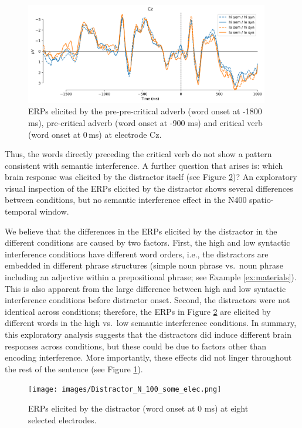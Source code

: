 \documentclass[a4paper, man, floatsintext]{apa7}
\begin{document}
\begin{figure}[H]
    \caption{ERPs elicited by the pre-pre-critical adverb (word onset at -1800 ms), pre-critical adverb (word onset at -900 ms) and critical verb (word onset at 0\,ms) at electrode Cz.}
    \label{fig:erp_precrit}
    \centering
    \includegraphics[width=0.95\textwidth]{images/N_103_Cz_precrit.png}
\end{figure}

Thus, the words directly preceding the critical verb do not show a pattern consistent with semantic interference. A further question that arises is: which brain response was elicited by the distractor itself (see Figure \ref{fig:erp_distractor})? An exploratory visual inspection of the ERPs elicited by the distractor shows several differences between conditions, but no semantic interference effect in the N400 spatio-temporal window. 

We believe that the differences in the ERPs elicited by the distractor in the different conditions are caused by two factors. First, the high and low syntactic interference conditions have different word orders, i.e., the distractors are embedded in different phrase structures (simple noun phrase vs.\ noun phrase including an adjective within a prepositional phrase; see Example \ref{ex:materials}). This is also apparent from the large difference between high and low syntactic interference conditions before distractor onset. Second, the distractors were not identical across conditions; therefore, the ERPs in Figure \ref{fig:erp_distractor} are elicited by different words in the high vs.\ low semantic interference conditions. In summary, this exploratory analysis suggests that the distractors did induce different brain responses across conditions, but these could be due to factors other than encoding interference. More importantly, these effects did not linger throughout the rest of the sentence (see Figure \ref{fig:erp_precrit}). 

\begin{figure}[H]
    \centering
        \caption{ERPs elicited by the distractor (word onset at 0 ms) at eight selected electrodes.}
    \label{fig:erp_distractor}\texttt{[image: images/Distractor\_N\_100\_some\_elec.png]}
\end{figure}
\end{document}
